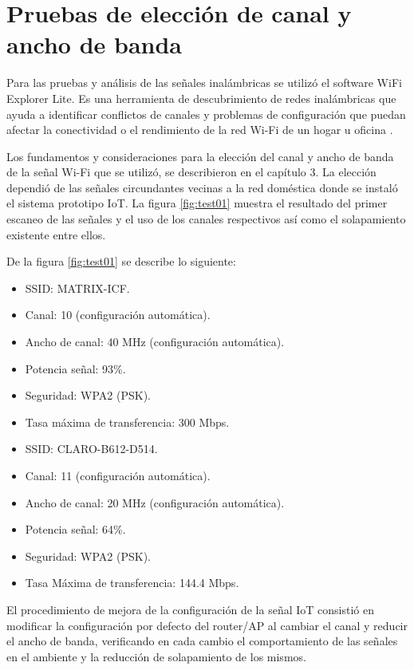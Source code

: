 \section{Pruebas de elección de canal y ancho de banda}
Para las pruebas y análisis de las señales inalámbricas se utilizó el software WiFi Explorer Lite. Es una herramienta de descubrimiento de redes inalámbricas que ayuda a identificar conflictos de canales y problemas de configuración que puedan afectar la conectividad o el rendimiento de la red Wi-Fi de un hogar u oficina \citep{WEBSITE:24}. 

Los fundamentos y consideraciones para la elección del canal y ancho de banda de la señal Wi-Fi que se utilizó, se describieron en el capítulo 3. La elección dependió de las señales circundantes vecinas a la red doméstica donde se instaló el sistema prototipo IoT. La figura \ref{fig:test01} muestra el resultado del primer escaneo de las señales y el uso de los canales respectivos así como el solapamiento existente entre ellos. 

De la figura \ref{fig:test01} se describe lo siguiente:

\begin{itemize}
\item SSID: MATRIX-ICF.
\item Canal: 10 (configuración automática).
\item Ancho de canal: 40 MHz (configuración automática).
\item Potencia señal: 93\%.
\item Seguridad:  WPA2 (PSK).
\item Tasa máxima de transferencia: 300 Mbps.
\end{itemize}


\begin{itemize} 
\item SSID: CLARO-B612-D514.
\item Canal: 11 (configuración automática).
\item Ancho de canal: 20 MHz (configuración automática).
\item Potencia señal: 64\%.
\item Seguridad: WPA2 (PSK).
\item Tasa Máxima de transferencia: 144.4 Mbps.
\end{itemize}

El procedimiento de mejora de la configuración de la señal IoT consistió en modificar la configuración por defecto del router/AP al cambiar el canal y reducir el ancho de banda, verificando en cada cambio el comportamiento de las señales en el ambiente y la reducción de solapamiento de los mismos.

